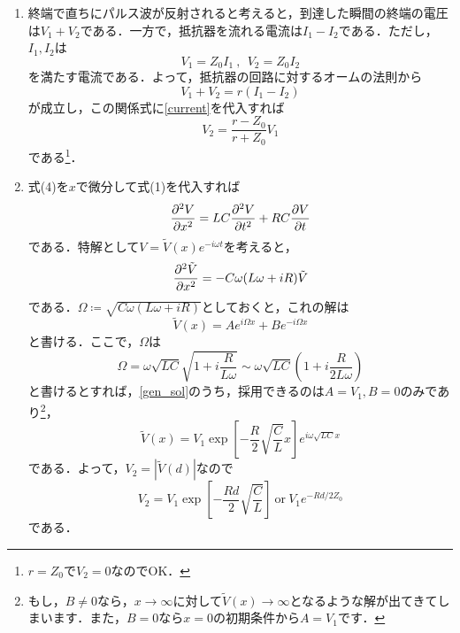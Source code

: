 \documentclass[a4paper,pdflatex,ja=standard]{bxjsarticle}
\begin{document}
\begin{enumerate}
  \item 
  終端で直ちにパルス波が反射されると考えると，到達した瞬間の終端の電圧は$V_{1}+V_{2}$である．一方で，抵抗器を流れる電流は$I_{1}-I_{2}$である．ただし，$I_{1},I_{2}$は
  \begin{equation}
    V_{1}=Z_{0}I_{1}
    \ ,\ \ 
    V_{2}=Z_{0}I_{2}
    \label{current}
  \end{equation}
  を満たす電流である．よって，抵抗器の回路に対するオームの法則から
  \begin{equation}
    V_{1}+V_{2}
    =
    r(I_{1}-I_{2})
  \end{equation}
  が成立し，この関係式に\eqref{current}を代入すれば
  \begin{equation}
    V_{2}
    =
    \frac{r-Z_{0}}{r+Z_{0}}
    V_{1}
  \end{equation}
  である\footnote{$r=Z_{0}$で$V_{2}=0$なのでOK．}．

  \item 
  式(4)を$x$で微分して式(1)を代入すれば
  \begin{equation}
    \pdv[2]{V}{x}
    =
    LC\pdv[2]{V}{t}
    +
    RC\pdv{V}{t}
  \end{equation}
  である．特解として$V=\tilde{V}(x)e^{-i\omega t}$を考えると，
  \begin{equation}
    \pdv[2]{\tilde{V}}{x}
    =
    -C\omega(L\omega+iR)\tilde{V}
  \end{equation}
  である．$\Omega\coloneqq\sqrt{C\omega(L\omega+iR)}$としておくと，これの解は
  \begin{equation}
    \tilde{V}(x)
    =
    Ae^{i\Omega x}
    +
    Be^{-i\Omega x}
    \label{gen_sol}
  \end{equation}
  と書ける．ここで，$\Omega$は
  \begin{equation}
    \Omega
    =
    \omega\sqrt{LC}\sqrt{1+i\frac{R}{L\omega}}
    \sim
    \omega\sqrt{LC}\left( 1+i\frac{R}{2L\omega} \right)
  \end{equation}
  と書けるとすれば，\eqref{gen_sol}のうち，採用できるのは$A=V_{1},B=0$のみであり\footnote{もし，$B\neq 0$なら，$x\rightarrow\infty$に対して$\tilde{V}(x)\rightarrow\infty$となるような解が出てきてしまいます．また，$B=0$なら$x=0$の初期条件から$A=V_{1}$です．}，
  \begin{equation}
    \tilde{V}(x)
    =
    V_{1}\exp\left[ -\frac{R}{2}\sqrt{\frac{C}{L}}x \right]e^{i\omega\sqrt{LC}x}
  \end{equation}
  である．よって，$V_{2}=|\tilde{V}(d)|$なので
  \begin{equation}
    V_{2}
    =
    V_{1}\exp\left[ -\frac{Rd}{2}\sqrt{\frac{C}{L}} \right]
    \ \text{or}\ 
    V_{1}e^{-Rd/2Z_{0}}
  \end{equation}
  である．


\end{enumerate}
\end{document}

